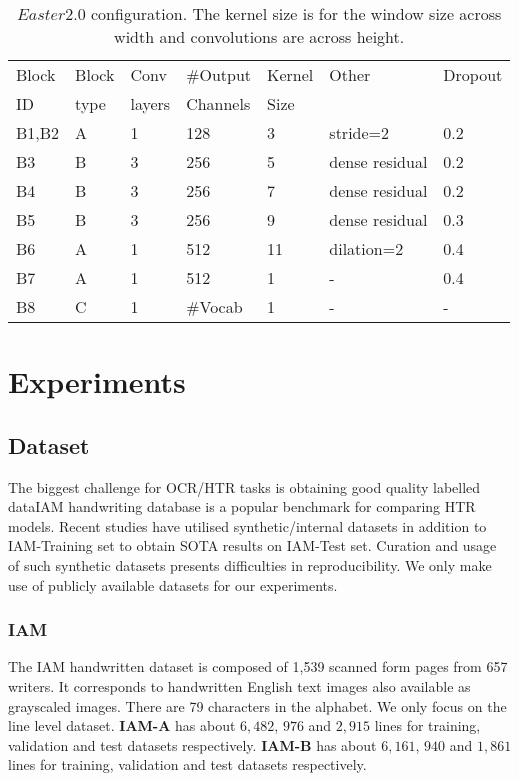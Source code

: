 \documentclass{article}
\begin{document}
\begin{table}
 \caption{$Easter2.0$ configuration. The kernel size is for the window size across width and convolutions are across height.}
  \centering
  \begin{tabular}{lllllll}
    \toprule
      Block & Block & Conv & \#Output & Kernel & Other & Dropout \\
      ID & type  & layers & Channels & Size &   & \\
    \midrule
    B1,B2 & A & 1 & 128 & 3 & stride=2 & 0.2\\
B3 & B & 3 & 256 & 5 & dense residual & 0.2\\
    B4 & B & 3 & 256 & 7 & dense residual & 0.2\\
    B5 & B & 3 & 256 & 9 & dense residual & 0.3\\
    B6 & A & 1 & 512 & 11 & dilation=2 & 0.4\\
    B7 & A & 1 & 512 & 1 & - & 0.4\\
    B8 & C & 1 & \#Vocab & 1 & - & -\\
    \bottomrule
  \end{tabular}
  \label{tab:config_table}
\end{table}

\section{Experiments}
\label{sec:headings2}
\subsection{Dataset}
The biggest challenge for OCR/HTR tasks is obtaining good quality labelled dataIAM handwriting database\cite{marti2002iam} is a popular benchmark for comparing HTR models. Recent studies have utilised synthetic/internal datasets in addition to IAM-Training set to obtain SOTA results on IAM-Test set. Curation and usage of such synthetic datasets presents difficulties in reproducibility. We only make use of publicly available datasets for our experiments.


\subsubsection{IAM} \label{iam}The IAM handwritten dataset is composed of 1,539 scanned
form pages from 657 writers. It corresponds to handwritten English text images also available as grayscaled images. There are 79 characters in the alphabet. We only focus on the line level dataset. \textbf{IAM-A} has about $6,482$, $976$ and $2,915$ lines for training, validation and test datasets respectively. \textbf{IAM-B} has about $6,161$, $940$ and $1,861$ lines for training, validation and test datasets respectively. 
\end{document}
